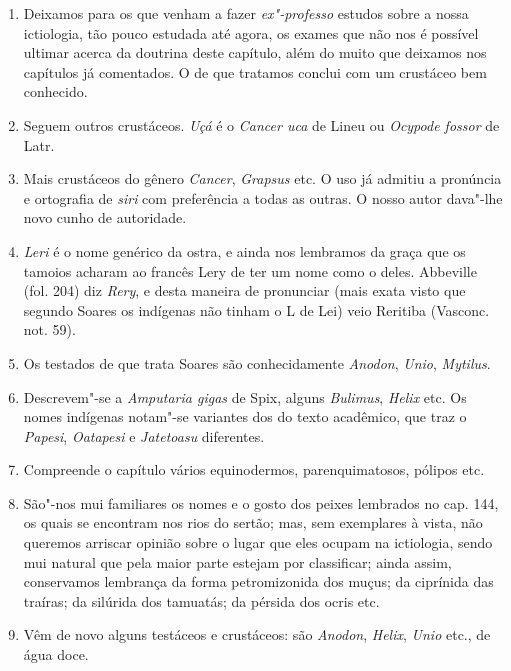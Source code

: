 \begin{enumerate}
\item Deixamos para os que venham a fazer \textit{ex"-professo} estudos sobre a nossa 
ictiologia, tão pouco estudada até agora, os exames que não nos é possível ultimar 
acerca da doutrina deste capítulo, além do muito que deixamos nos capítulos já 
comentados. O de que tratamos conclui com um crustáceo bem conhecido.

\item Seguem outros crustáceos. \textit{Uçá} é o \textit{Cancer uca} de Lineu ou \textit{Ocypode fossor} de Latr.

\item Mais crustáceos do gênero \textit{Cancer}, \textit{Grapsus} etc. O uso já admitiu a pronúncia 
e ortografia de \textit{siri} com preferência a todas as outras. O nosso autor dava"-lhe novo 
cunho de autoridade.

\item \textit{Leri} é o nome genérico da ostra, e ainda nos lembramos da graça que os tamoios 
acharam ao francês Lery de ter um nome como o deles. Abbeville (fol. 204) diz \textit{Rery}, e 
desta maneira de pronunciar (mais exata visto que segundo Soares os indígenas não 
tinham o L de Lei) veio Reritiba (Vasconc. not. 59).

\item Os testados de que trata Soares são conhecidamente \textit{Anodon}, \textit{Unio}, \textit{Mytilus}.

\item Descrevem"-se a \textit{Amputaria gigas} de Spix, alguns \textit{Bulimus}, \textit{Helix} etc. Os nomes 
indígenas notam"-se variantes dos do texto acadêmico, que traz o \textit{Papesi}, \textit{Oatapesi} e 
\textit{Jatetoasu} diferentes.

\item Compreende o capítulo vários equinodermos, parenquimatosos, pólipos etc.

\item São"-nos mui familiares os nomes e o gosto dos peixes lembrados no cap. 144, os 
quais se encontram nos rios do sertão; mas, sem exemplares à vista, não queremos 
arriscar opinião sobre o lugar que eles ocupam na ictiologia, sendo mui natural que pela 
maior parte estejam por classificar; ainda assim, conservamos lembrança da forma 
petromizonida dos muçus; da ciprínida das traíras; da silúrida dos tamuatás; da pérsida 
dos ocris etc.

\item Vêm de novo alguns testáceos e crustáceos: são \textit{Anodon}, \textit{Helix}, \textit{Unio} etc., de água 
doce.


\end{enumerate}
